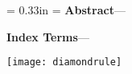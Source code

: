 {\begin{center}
{               \begingroup%
                   \def\@captype{figure}%
                   \vgtc@teaser%
               \endgroup\par%
             }
               \vspace{\teaserspace}%
           \fi%
       \end{center} \par%
   \fi
   \ifvgtcjournal%
       {\scriptsize\sffamily%
       \leftskip = 0.33in \rightskip = \leftskip%
       \ifx\vgtc@abstxt\vgtc@empty \else%
            \begingroup%
                {\bfseries Abstract}---\vgtc@abstxt%
            \endgroup\par%
        \fi%
        \ifx\vgtc@keywords\vgtc@empty \else%
            \begingroup%
                \vspace{0.5\baselineskip}%
                \par\noindent \textbf{Index Terms}---\vgtc@keywords%
            \endgroup\par%
        \fi%
        }%
  \begin{center}\texttt{[image: diamondrule]}\end{center}
  \ifx\firstsectiontxt\vgtc@empty \else
    \section{\firstsectiontxt}
  \fi
    \fi%
}

